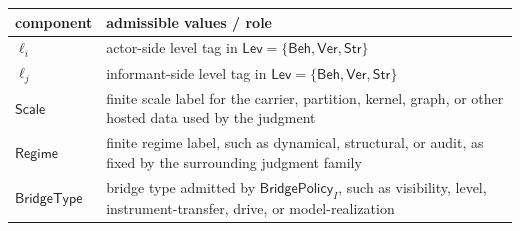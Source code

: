 \documentclass[11pt]{article}
\theoremstyle{definition}
\begin{document}
\begin{longtable}[]{@{}ll@{}}
\toprule
\begin{minipage}[b]{0.47\columnwidth}\raggedright
component\strut
\end{minipage} & \begin{minipage}[b]{0.47\columnwidth}\raggedright
admissible values / role\strut
\end{minipage}\tabularnewline
\midrule
\endhead
\begin{minipage}[t]{0.47\columnwidth}\raggedright
\(\ell_i\)\strut
\end{minipage} & \begin{minipage}[t]{0.47\columnwidth}\raggedright
actor-side level tag in \(\mathsf{Lev}=\{\mathsf{Beh},\mathsf{Ver},\mathsf{Str}\}\)\strut
\end{minipage}\tabularnewline
\begin{minipage}[t]{0.47\columnwidth}\raggedright
\(\ell_j\)\strut
\end{minipage} & \begin{minipage}[t]{0.47\columnwidth}\raggedright
informant-side level tag in \(\mathsf{Lev}=\{\mathsf{Beh},\mathsf{Ver},\mathsf{Str}\}\)\strut
\end{minipage}\tabularnewline
\begin{minipage}[t]{0.47\columnwidth}\raggedright
\(\mathsf{Scale}\)\strut
\end{minipage} & \begin{minipage}[t]{0.47\columnwidth}\raggedright
finite scale label for the carrier, partition, kernel, graph, or other hosted data used by the judgment\strut
\end{minipage}\tabularnewline
\begin{minipage}[t]{0.47\columnwidth}\raggedright
\(\mathsf{Regime}\)\strut
\end{minipage} & \begin{minipage}[t]{0.47\columnwidth}\raggedright
finite regime label, such as dynamical, structural, or audit, as fixed by the surrounding judgment family\strut
\end{minipage}\tabularnewline
\begin{minipage}[t]{0.47\columnwidth}\raggedright
\(\mathsf{BridgeType}\)\strut
\end{minipage} & \begin{minipage}[t]{0.47\columnwidth}\raggedright
bridge type admitted by \(\mathsf{BridgePolicy}_I\), such as visibility, level, instrument-transfer, drive, or model-realization\strut
\end{minipage}\tabularnewline

\end{longtable}
\end{document}
